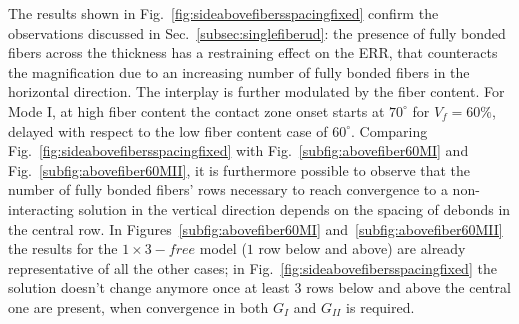 \documentclass[review]{elsarticle}
\begin{document}
The results shown in Fig.~\ref{fig:sideabovefibersspacingfixed} confirm the observations discussed in Sec.~\ref{subsec:singlefiberud}: the presence of fully bonded fibers across the thickness has a restraining effect on the ERR, that counteracts the magnification due to an increasing number of fully bonded fibers in the horizontal direction. The interplay is further modulated by the fiber content. For Mode I, at high fiber content the contact zone onset starts at $70^{\circ}$ for $V_{f}=60\%$, delayed with respect to the low fiber content case of $60^{\circ}$. Comparing Fig.~\ref{fig:sideabovefibersspacingfixed} with Fig.~\ref{subfig:abovefiber60MI} and Fig.~\ref{subfig:abovefiber60MII}, it is furthermore possible to observe that the number of fully bonded fibers' rows necessary to reach convergence to a non-interacting solution in the vertical direction depends on the spacing of debonds in the central row. In Figures~\ref{subfig:abovefiber60MI} and~\ref{subfig:abovefiber60MII} the results for the $1\times 3-free$ model ($1$ row below and above) are already representative of all the other cases; in Fig.~\ref{fig:sideabovefibersspacingfixed} the solution doesn't change anymore once at least $3$ rows below and above the central one are present, when convergence in both $G_{I}$ and $G_{II}$ is required.

\end{document}
